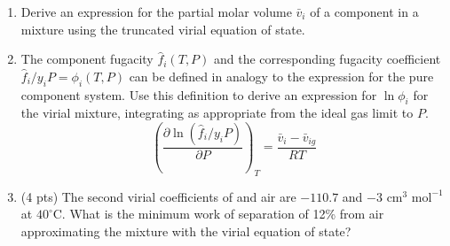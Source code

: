 \documentclass[11pt]{article}
\begin{document}
\begin{enumerate}
\item Derive an expression for the partial molar volume \(\bar v_{i}\) of a component in a
mixture using the truncated virial equation of state.

\item The component fugacity \(\hat{f}_{i}(T,P)\) and the corresponding
fugacity coefficient \(\hat{f}_i/y_i P = \phi_i(T,P)\) can be defined
in analogy to the expression for the pure component system.  Use
this definition to derive an expression for \(\ln \phi_i\) for the
virial mixture, integrating as appropriate from the ideal gas limit
to \(P\).
\begin{equation}
  \left ( \frac{\partial\ln\left(\hat{f}_{i}/y_{i}P\right)}{\partial P} \right )_{T} = \frac{\bar{v}_{i} - \bar{v}_{ig}}{RT}
\end{equation}

\item (4 pts) The second virial coefficients of  and air are
\(-110.7\) and \(-3 \text{ cm}^3 \text{ mol}^{-1}\) at
\(40^\circ\)C. What is the minimum work of separation of 12\%
 from air approximating the mixture with the virial
equation of state?
\end{enumerate}
\end{document}
